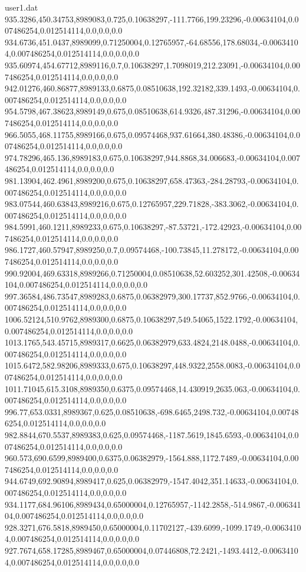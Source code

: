 \begin{filecontents}{user1.dat}
935.3286,450.34753,8989083,0.725,0.10638297,-111.7766,199.23296,-0.00634104,0.007486254,0.012514114,0.0,0.0,0.0
934.6736,451.0437,8989099,0.71250004,0.12765957,-64.68556,178.68034,-0.00634104,0.007486254,0.012514114,0.0,0.0,0.0
935.60974,454.67712,8989116,0.7,0.10638297,1.7098019,212.23091,-0.00634104,0.007486254,0.012514114,0.0,0.0,0.0
942.01276,460.86877,8989133,0.6875,0.08510638,192.32182,339.1493,-0.00634104,0.007486254,0.012514114,0.0,0.0,0.0
954.5798,467.38623,8989149,0.675,0.08510638,614.9326,487.31296,-0.00634104,0.007486254,0.012514114,0.0,0.0,0.0
966.5055,468.11755,8989166,0.675,0.09574468,937.61664,380.48386,-0.00634104,0.007486254,0.012514114,0.0,0.0,0.0
974.78296,465.136,8989183,0.675,0.10638297,944.8868,34.006683,-0.00634104,0.007486254,0.012514114,0.0,0.0,0.0
981.13904,462.4961,8989200,0.675,0.10638297,658.47363,-284.28793,-0.00634104,0.007486254,0.012514114,0.0,0.0,0.0
983.07544,460.63843,8989216,0.675,0.12765957,229.71828,-383.3062,-0.00634104,0.007486254,0.012514114,0.0,0.0,0.0
984.5991,460.1211,8989233,0.675,0.10638297,-87.53721,-172.42923,-0.00634104,0.007486254,0.012514114,0.0,0.0,0.0
986.1727,460.57947,8989250,0.7,0.09574468,-100.73845,11.278172,-0.00634104,0.007486254,0.012514114,0.0,0.0,0.0
990.92004,469.63318,8989266,0.71250004,0.08510638,52.603252,301.42508,-0.00634104,0.007486254,0.012514114,0.0,0.0,0.0
997.36584,486.73547,8989283,0.6875,0.06382979,300.17737,852.9766,-0.00634104,0.007486254,0.012514114,0.0,0.0,0.0
1006.52124,510.9762,8989300,0.6875,0.10638297,549.54065,1522.1792,-0.00634104,0.007486254,0.012514114,0.0,0.0,0.0
1013.1765,543.45715,8989317,0.6625,0.06382979,633.4824,2148.0488,-0.00634104,0.007486254,0.012514114,0.0,0.0,0.0
1015.6472,582.98206,8989333,0.675,0.10638297,448.9322,2558.0083,-0.00634104,0.007486254,0.012514114,0.0,0.0,0.0
1011.71045,615.3108,8989350,0.6375,0.09574468,14.430919,2635.063,-0.00634104,0.007486254,0.012514114,0.0,0.0,0.0
996.77,653.0331,8989367,0.625,0.08510638,-698.6465,2498.732,-0.00634104,0.007486254,0.012514114,0.0,0.0,0.0
982.8844,670.5537,8989383,0.625,0.09574468,-1187.5619,1845.6593,-0.00634104,0.007486254,0.012514114,0.0,0.0,0.0
960.573,690.6599,8989400,0.6375,0.06382979,-1564.888,1172.7489,-0.00634104,0.007486254,0.012514114,0.0,0.0,0.0
944.6749,692.90894,8989417,0.625,0.06382979,-1547.4042,351.14633,-0.00634104,0.007486254,0.012514114,0.0,0.0,0.0
934.1177,684.96106,8989434,0.65000004,0.12765957,-1142.2858,-514.9867,-0.00634104,0.007486254,0.012514114,0.0,0.0,0.0
928.3271,676.5818,8989450,0.65000004,0.11702127,-439.6099,-1099.1749,-0.00634104,0.007486254,0.012514114,0.0,0.0,0.0
927.7674,658.17285,8989467,0.65000004,0.07446808,72.2421,-1493.4412,-0.00634104,0.007486254,0.012514114,0.0,0.0,0.0

\end{filecontents}
